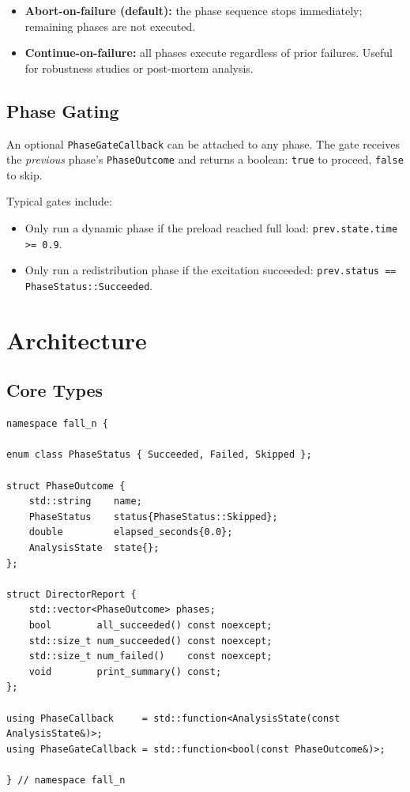 \begin{itemize}
  \item \textbf{Abort-on-failure (default):} the phase sequence stops
        immediately; remaining phases are not executed.
  \item \textbf{Continue-on-failure:} all phases execute regardless of
        prior failures.  Useful for robustness studies or post-mortem
        analysis.
\end{itemize}

\subsection{Phase Gating}

An optional \texttt{PhaseGateCallback} can be attached to any phase.
The gate receives the \emph{previous} phase's \texttt{PhaseOutcome} and
returns a boolean: \texttt{true} to proceed, \texttt{false} to skip.

Typical gates include:
\begin{itemize}
  \item Only run a dynamic phase if the preload reached full load:
        \texttt{prev.state.time >= 0.9}.
  \item Only run a redistribution phase if the excitation succeeded:
        \texttt{prev.status == PhaseStatus::Succeeded}.
\end{itemize}


\section{Architecture}

\subsection{Core Types}

\begin{verbatim}
namespace fall_n {

enum class PhaseStatus { Succeeded, Failed, Skipped };

struct PhaseOutcome {
    std::string    name;
    PhaseStatus    status{PhaseStatus::Skipped};
    double         elapsed_seconds{0.0};
    AnalysisState  state{};
};

struct DirectorReport {
    std::vector<PhaseOutcome> phases;
    bool        all_succeeded() const noexcept;
    std::size_t num_succeeded() const noexcept;
    std::size_t num_failed()    const noexcept;
    void        print_summary() const;
};

using PhaseCallback     = std::function<AnalysisState(const AnalysisState&)>;
using PhaseGateCallback = std::function<bool(const PhaseOutcome&)>;

} // namespace fall_n
\end{verbatim}


